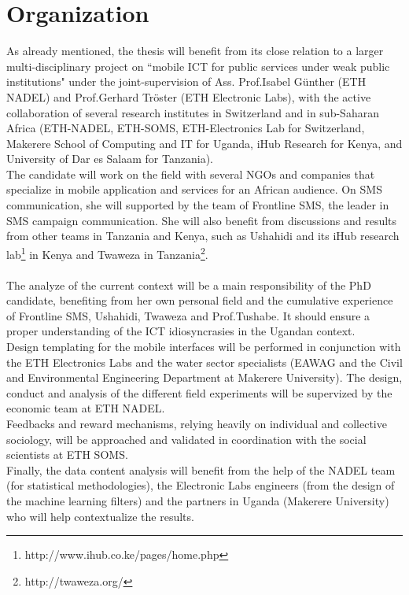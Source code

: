\documentclass[11pt]{article}
\begin{document}



\section{Organization}\label{organization}
As already mentioned, the thesis will benefit from its close relation to a larger multi-disciplinary project on ``mobile ICT for public services under weak public institutions" under the joint-supervision of Ass. Prof.Isabel G\"{u}nther (ETH NADEL) and Prof.Gerhard Tr\"{o}ster (ETH Electronic Labs), with the active collaboration of several research institutes in Switzerland and in sub-Saharan Africa (ETH-­NADEL, ETH-­SOMS, ETH-­Electronics Lab for Switzerland, Makerere School of Computing and IT for Uganda, iHub Research for Kenya, and University of Dar es Salaam for Tanzania).  
\\
The candidate will work on the field with several NGOs and companies that specialize in mobile application and services for an African audience. On SMS communication, she will supported by the team of Frontline SMS, the leader in SMS campaign communication. She will also benefit from discussions and results from other teams in Tanzania and Kenya, such as Ushahidi and its iHub research lab\footnote{http://www.ihub.co.ke/pages/home.php} in Kenya and Twaweza in Tanzania\footnote{http://twaweza.org/}.
\\\\
The analyze of the current context will be a main responsibility of the PhD candidate, benefiting from her own personal field and the cumulative experience of Frontline SMS, Ushahidi, Twaweza and Prof.Tushabe. It should ensure a proper understanding of the ICT idiosyncrasies in the Ugandan context.
\\
Design templating for the mobile interfaces will be performed in conjunction with the ETH Electronics Labs and the water sector specialists (EAWAG and the Civil and Environmental Engineering Department at Makerere University). The design, conduct and analysis of the different field experiments will be supervized by the economic team at ETH NADEL.
\\
Feedbacks and reward mechanisms, relying heavily on individual and collective sociology, will be approached and validated in coordination with the social scientists at ETH SOMS.
\\
Finally, the data content analysis will benefit from the help of the NADEL team (for statistical methodologies), the Electronic Labs engineers (from the design of the machine learning filters) and the partners in Uganda (Makerere University) who will help contextualize the results.    
\end{document}
